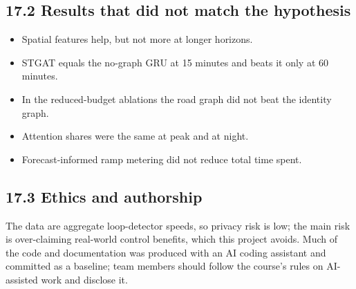 \documentclass[10pt,a4paper]{article}
\begin{document}
\subsection*{17.2 Results that did not match the hypothesis}
\begin{itemize}[nosep,leftmargin=*]
\item Spatial features help, but not more at longer horizons.
\item STGAT equals the no-graph GRU at 15 minutes and beats it only at 60 minutes.
\item In the reduced-budget ablations the road graph did not beat the identity graph.
\item Attention shares were the same at peak and at night.
\item Forecast-informed ramp metering did not reduce total time spent.
\end{itemize}

\subsection*{17.3 Ethics and authorship}
The data are aggregate loop-detector speeds, so privacy risk is low; the main risk is over-claiming real-world control benefits, which this project avoids. Much of the code and documentation was produced with an AI coding assistant and committed as a baseline; team members should follow the course's rules on AI-assisted work and disclose it.
\end{document}
